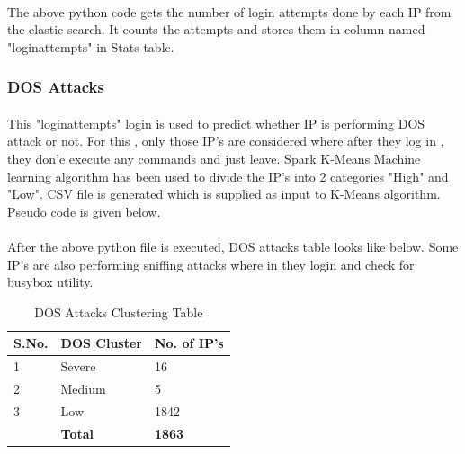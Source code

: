 \documentclass{report}
\begin{document}


\paragraph{}
The above python code gets the number of login attempts done by each IP from the elastic search. It counts the attempts and stores them in column named "loginattempts" in Stats table. 

\subsubsection{DOS Attacks}
\paragraph{}
This "loginattempts" login is used to predict whether IP is performing DOS attack or not. For this , only those IP's are considered where after they log in , they don'e execute any commands and just leave. Spark K-Means Machine learning algorithm has been used to divide the IP's into 2 categories "High" and "Low". CSV file is generated  which is supplied as input to K-Means algorithm. Pseudo code is given below.







\paragraph{}
After the above python file is executed, DOS attacks table looks like below.
Some IP's are also performing sniffing attacks where in they login and check for busybox utility.

\begin{table}[H]
\begin{tabular}{ |p{2cm}|p{5cm}|p{5cm}|  }
 \hline
 \textbf{S.No.} & \textbf{DOS Cluster} & \textbf{No. of IP's}\\
 \hline
 \hline
 1 & Severe & 16 \\
 \hline
2 & Medium & 5 \\
\hline
3 & Low & 1842 \\
\hline
\hline
 & \textbf{Total} & \textbf{1863} \\
\hline
\end{tabular}
 \caption{DOS Attacks Clustering Table}
\end{table}
\end{document}
